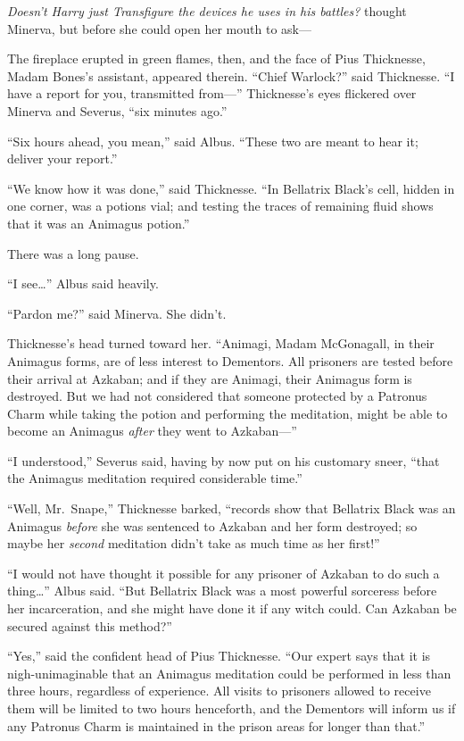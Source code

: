 \emph{Doesn't Harry just Transfigure the devices he uses in his
battles?} thought Minerva, but before she could open her mouth to ask---

The fireplace erupted in green flames, then, and the face of Pius
Thicknesse, Madam Bones's assistant, appeared therein. ``Chief
Warlock?'' said Thicknesse. ``I have a report for you, transmitted
from---'' Thicknesse's eyes flickered over Minerva and Severus, ``six
minutes ago.''

``Six hours ahead, you mean,'' said Albus. ``These two are meant to hear
it; deliver your report.''

``We know how it was done,'' said Thicknesse. ``In Bellatrix Black's
cell, hidden in one corner, was a potions vial; and testing the traces
of remaining fluid shows that it was an Animagus potion.''

There was a long pause.

``I see\ldots{}'' Albus said heavily.

``Pardon me?'' said Minerva. She didn't.

Thicknesse's head turned toward her. ``Animagi, Madam McGonagall, in
their Animagus forms, are of less interest to Dementors. All prisoners
are tested before their arrival at Azkaban; and if they are Animagi,
their Animagus form is destroyed. But we had not considered that someone
protected by a Patronus Charm while taking the potion and performing the
meditation, might be able to become an Animagus \emph{after} they went
to Azkaban---''

``I understood,'' Severus said, having by now put on his customary
sneer, ``that the Animagus meditation required considerable time.''

``Well, Mr.~Snape,'' Thicknesse barked, ``records show that Bellatrix
Black was an Animagus \emph{before} she was sentenced to Azkaban and her
form destroyed; so maybe her \emph{second} meditation didn't take as
much time as her first!''

``I would not have thought it possible for any prisoner of Azkaban to do
such a thing\ldots{}'' Albus said. ``But Bellatrix Black was a most
powerful sorceress before her incarceration, and she might have done it
if any witch could. Can Azkaban be secured against this method?''

``Yes,'' said the confident head of Pius Thicknesse. ``Our expert says
that it is nigh-unimaginable that an Animagus meditation could be
performed in less than three hours, regardless of experience. All visits
to prisoners allowed to receive them will be limited to two hours
henceforth, and the Dementors will inform us if any Patronus Charm is
maintained in the prison areas for longer than that.''

